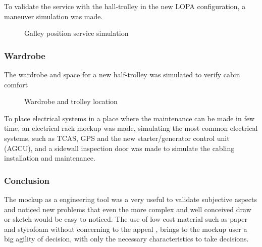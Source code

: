 To validate the service with the hall-trolley in the new LOPA configuration, a maneuver simulation was made.

\begin{figure}[H] %
\caption{Galley position service simulation}
\label{fig:galleypos_service}
\end{figure}



\subsubsection{Wardrobe}
The wardrobe and space for a new half-trolley was simulated to verify cabin comfort

\begin{figure}[H] %
\caption{ Wardrobe and trolley location}
\label{fig:newtrolley}
\end{figure}

To place electrical systems in a place where the maintenance can be made in few time, an electrical rack mockup was made, simulating the most common electrical systems, such as TCAS, GPS and the new starter/generator control unit (AGCU), and a sidewall inspection door was made to simulate the cabling installation and maintenance.


\subsubsection{Conclusion}
The mockup as a engineering tool was a very useful to validate subjective aspects and noticed new problems that even the more complex and well conceived draw or sketch would be easy to noticed.
The use of low cost material such as paper and styrofoam without concerning to the appeal , brings to the mockup user a big agility of decision, with only the necessary characteristics to take decisions.




